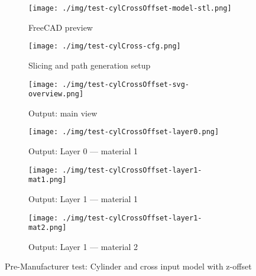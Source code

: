 \begin{figure}[htbp!]
  \centering
  \begin{subfigure}[t]{0.6\textwidth}
  \centering
  \texttt{[image: ./img/test-cylCrossOffset-model-stl.png]}
  \caption{FreeCAD preview}%
  \label{fig:cyl-crossOffset-model-stl}
  \end{subfigure}
%
  \begin{subfigure}[t]{0.38\textwidth}
  \centering
  \texttt{[image: ./img/test-cylCross-cfg.png]}
  \caption{Slicing and path generation setup}%
  \label{fig:cyl-cross-cfg-2}
\end{subfigure}
%
  \begin{subfigure}[t]{0.48\textwidth}
  \centering
  \texttt{[image: ./img/test-cylCrossOffset-svg-overview.png]}
  \caption{Output: main view}%
  \label{fig:cyl-crossOffset-main}
\end{subfigure}
%
  \begin{subfigure}[t]{0.48\textwidth}
  \centering
  \texttt{[image: ./img/test-cylCrossOffset-layer0.png]}
  \caption{Output: Layer 0 --- material 1}%
  \label{fig:cyl-crossOffset-layer0}
\end{subfigure}
%
  \begin{subfigure}[t]{0.48\textwidth}
  \centering
  \texttt{[image: ./img/test-cylCrossOffset-layer1-mat1.png]}
  \caption{Output: Layer 1 --- material 1}%
  \label{fig:cyl-crossOffset-layer1-mat1}
\end{subfigure}
%
  \begin{subfigure}[t]{0.48\textwidth}
  \centering
  \texttt{[image: ./img/test-cylCrossOffset-layer1-mat2.png]}
  \caption{Output: Layer 1 --- material 2}%
  \label{fig:cyl-crossOffset-layer1-mat2}
\end{subfigure}
%
  \caption{Pre-Manufacturer test: Cylinder and cross input model with z-offset}%
  \label{fig:test-cyl-crossOffset}
\end{figure}

